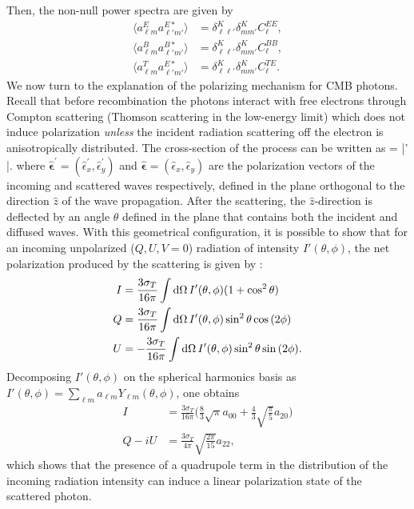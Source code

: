 Then, the non-null power spectra are given by 
%
\begin{align}
\langle a_{\ell m}^E a_{\ell' m'}^{E*}\rangle &= \delta^K_{\ell\ell'}\delta^K_{mm'}C_{\ell}^{EE}, \\
\langle a_{\ell m}^B a_{\ell' m'}^{B*}\rangle &= \delta^K_{\ell\ell'}\delta^K_{mm'}C_{\ell}^{BB},\\
\langle a_{\ell m}^T a_{\ell' m'}^{E*}\rangle &= \delta^K_{\ell\ell'}\delta^K_{mm'}C_{\ell}^{TE}.
\end{align}
%
We now turn to the explanation of the polarizing mechanism for \gls{CMB} photons. Recall that before recombination the photons
interact with free electrons through Compton scattering (Thomson scattering in the 
low-energy limit) which does not induce polarization \emph{unless} the incident radiation scattering off the
electron is anisotropically distributed. The cross-section of the process can be written as
%
\be
\frac{\diff\sigma}{\diff\Omega} =  |\hat{\bm{\epsilon}}' \cdot \hat{\bm{\epsilon}}|.
\ee
%
where $\hat{\bm{\epsilon}}^{\prime}=(\hat{\epsilon}^{\prime}_x,\hat{\epsilon}^{\prime}_y)$ and $\hat{\bm{\epsilon}}=(\hat{\epsilon}_x,\hat{\epsilon}_y)$ are the polarization vectors of the incoming and scattered 
waves respectively, defined in the plane orthogonal to the direction $\hat{z}$ of the wave propagation. 
After the scattering, the $\hat{z}$-direction is deflected by an angle $\theta$ defined in the plane that 
contains both the incident and diffused waves. With this geometrical configuration, it is possible to show 
that for an incoming unpolarized ($Q,U,V=0$) radiation of intensity $I'(\theta,\phi)$, the net
polarization produced by the scattering is given by \citep{Kosowsky1996}:
%
\begin{align}
I    &= \frac{3\sigma_T}{16\pi} \int \mathop{}\!\mathrm{d}\Omega\, I'(\theta,\phi)(1+\cos^2{\theta}) \\ 
Q  &= \frac{3\sigma_T}{16\pi} \int \mathop{}\!\mathrm{d}\Omega\, I'(\theta,\phi)\sin^2{\theta}\cos{(2\phi)} \\ 
U &= -\frac{3\sigma_T}{16\pi} \int \mathop{}\!\mathrm{d}\Omega\, I'(\theta,\phi)\sin^2{\theta}\sin{(2\phi)}. 
\end{align}
%
Decomposing $I'(\theta,\phi)$ on the spherical harmonics basis as $I'(\theta,\phi)=\sum_{\ell m}a_{\ell m}Y_{\ell m}(\theta,\phi)$, one obtains
%
\begin{align}
I    &=    \frac{3\sigma_T}{16\pi}\biggl(\frac{8}{3}\sqrt{\pi}a_{00}+\frac{4}{3}\sqrt{\frac{\pi}{5}}a_{20} \biggr) \\ 
Q - iU &=    \frac{3\sigma_T}{4\pi} \sqrt{\frac{2\pi}{15}}a_{22},  
\end{align}
%
which shows that the presence of a quadrupole term in the distribution of the incoming radiation intensity  
can induce a linear polarization state of the scattered photon.

